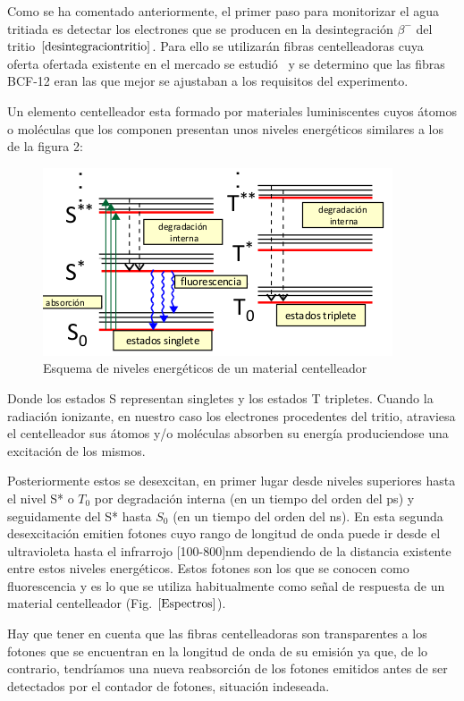 Como se ha comentado anteriormente, el primer paso para monitorizar el agua tritiada es detectar los electrones que se producen en la desintegración $\beta^-$ del tritio $\eqref{desintegraciontritio}$. Para ello se utilizarán fibras centelleadoras cuya oferta ofertada existente en el mercado se estudió~\cite{Alberto} y se determino que las fibras BCF-12 eran las que mejor se ajustaban a los requisitos del experimento. 

Un elemento centelleador esta formado por materiales luminiscentes cuyos átomos o moléculas que los componen presentan unos niveles energéticos similares a los de la figura 2:

\begin{figure}[hbtp]
\centering
\includegraphics[scale=0.7]{EsquemaNivelesFIbras.png}
\caption{Esquema de niveles energéticos de un material centelleador~\cite{asignatura}\label{Esquemafibras}
}
\end{figure}

Donde los estados S representan singletes y los estados T tripletes. Cuando la radiación ionizante, en nuestro caso los electrones procedentes del tritio, atraviesa el centelleador sus átomos y/o moléculas absorben su energía produciendose una excitación de los mismos. 

Posteriormente estos se desexcitan, en primer lugar desde niveles superiores hasta el nivel S* o $T_0$ por degradación interna (en un tiempo del orden del ps) y seguidamente del S* hasta $S_0$ (en un tiempo del orden del ns). En esta segunda desexcitación emitien fotones cuyo rango de longitud de onda puede ir desde el ultravioleta hasta el infrarrojo [100-800]nm dependiendo de la distancia existente entre estos niveles energéticos. Estos fotones son los que se conocen como fluorescencia y es lo que se utiliza habitualmente como señal de respuesta de un material centelleador (Fig. $\ref{Espectros}$).

Hay que tener en cuenta que las fibras centelleadoras son transparentes a los fotones que se encuentran en la longitud de onda de su emisión ya que, de lo contrario, tendríamos una nueva reabsorción de los fotones emitidos antes de ser detectados por el contador de fotones, situación indeseada.

